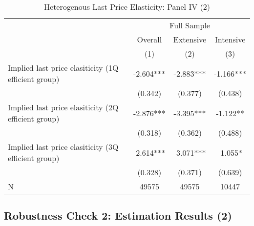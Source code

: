 \documentclass[ review  , 3p ]{elsarticle}
\begin{document}
  \begin{table}
  
  \caption{\label{tab:kableHeteroLastElasticitySlide2}Heterogenous Last Price Elasticity: Panel IV (2)}
  \centering
  \fontsize{8}{10}\selectfont
  \begin{tabular}[t]{lccc}
  \toprule
  \multicolumn{1}{c}{ } & \multicolumn{3}{c}{Full Sample} \\
  \cmidrule(l{3pt}r{3pt}){2-4}
  \multicolumn{1}{c}{ } & \multicolumn{1}{c}{Overall} & \multicolumn{1}{c}{Extensive} & \multicolumn{1}{c}{Intensive} \\
  \cmidrule(l{3pt}r{3pt}){2-2} \cmidrule(l{3pt}r{3pt}){3-3} \cmidrule(l{3pt}r{3pt}){4-4}
   & (1) & (2) & (3)\\
  \midrule
  Implied last price elasiticity (1Q efficient group) & -2.604*** & -2.883*** & -1.166***\\
   & (0.342) & (0.377) & (0.438)\\
  Implied last price elasiticity (2Q efficient group) & -2.876*** & -3.395*** & -1.122**\\
   & (0.318) & (0.362) & (0.488)\\
  Implied last price elasiticity (3Q efficient group) & -2.614*** & -3.071*** & -1.055*\\
   & (0.328) & (0.371) & (0.639)\\
  N & 49575 & 49575 & 10447\\
  \bottomrule
  \end{tabular}
  \end{table}
  
  \hypertarget{robustness-check-2-estimation-results-2}{%
  \subsection{Robustness Check 2: Estimation Results (2)}\label{robustness-check-2-estimation-results-2}}
  
\end{document}
